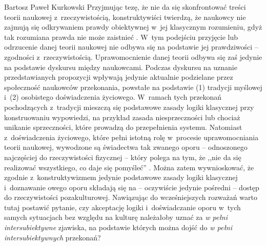 \begin{artplenv}{Bartosz Paweł Kurkowski}
Przyjmując tezę, że nie da się skonfrontować treści teorii naukowej z~rzeczywistością, konstruktywiści twierdzą, że
naukowcy nie zajmują się odkrywaniem prawdy obiektywnej w~jej klasycznym rozumieniu, gdyż tak rozumiana prawda nie może
zaistnieć
\parencite[s.~34]{zboron_teorie_2009}.
W~tym podejściu przyjęcie lub odrzucenie danej teorii
naukowej nie odbywa się na podstawie jej prawdziwości -- zgodności z~rzeczywistością. Uprawomocnienie danej teorii
odbywa się zaś jedynie na podstawie dyskursu między naukowcami. Podczas dyskursu na uznanie przedstawianych propozycji
wpływają jedynie aktualnie podzielane przez społeczność naukowców przekonania, powstałe na podstawie (1) tradycji
myślowej i~(2) osobistego doświadczenia życiowego. W~ramach tych przekonań pochodzących z~tradycji mieszczą się
podstawowe zasady logiki klasycznej przy konstruowaniu wypowiedzi, na przykład zasada niesprzeczności lub chociaż
unikanie sprzeczności, które prowadzą do przepełnienia systemu. Natomiast z~doświadczenia życiowego, które pełni
istotną rolę w~procesie uprawomocniania teorii naukowej, wywodzone są świadectwa tak zwanego oporu -- odnoszonego
najczęściej do rzeczywistości fizycznej
\parencite[s.~50]{zboron_teorie_2009}
 -- który polega na tym, że ,,nie
da się realizować wszystkiego, co daje się pomyśleć''
\parencite[s.~42]{zboron_teorie_2009}.
Można zatem
wywnioskować, że zgodnie z~konstruktywizmem jedynie podstawowe zasady logiki klasycznej i~doznawanie owego oporu
składają się na -- oczywiście jedynie pośredni -- dostęp do rzeczywistości pozakulturowej. Nawiązując do wcześniejszych
rozważań warto tutaj postawić pytanie, czy akceptację logiki i~doświadczanie oporu w~tych samych sytuacjach bez względu
na kulturę należałoby uznać za \textit{w pełni intersubiektywne} zjawiska, na podstawie których  można dojść do
\textit{w pełni intersubiektywnych} przekonań?



\end{artplenv}
